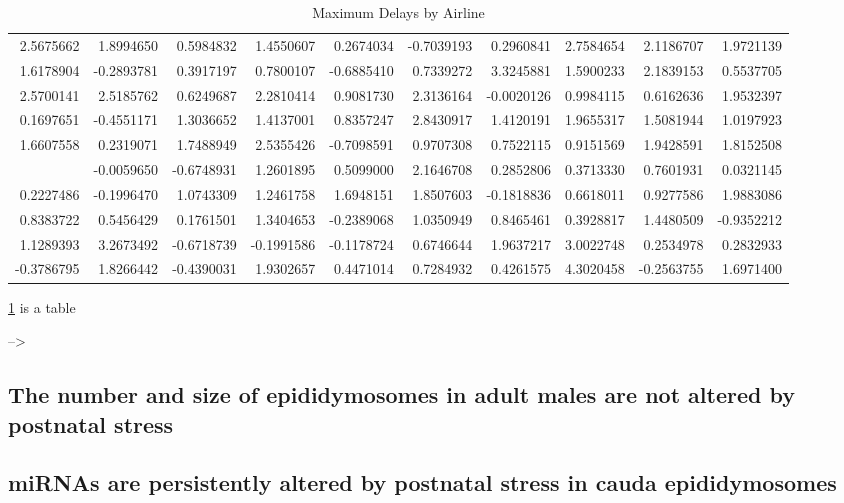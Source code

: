 \documentclass[12pt,twoside]{reedthesis}
\begin{document}
\begin{longtable}[t]{rrrrrrrrrr}
\caption[Max Delays by Airline]{\label{tab:tab1}Maximum Delays by Airline}\\
\toprule
2.5675662 & 1.8994650 & 0.5984832 & 1.4550607 & 0.2674034 & -0.7039193 & 0.2960841 & 2.7584654 & 2.1186707 & 1.9721139\\
1.6178904 & -0.2893781 & 0.3917197 & 0.7800107 & -0.6885410 & 0.7339272 & 3.3245881 & 1.5900233 & 2.1839153 & 0.5537705\\
2.5700141 & 2.5185762 & 0.6249687 & 2.2810414 & 0.9081730 & 2.3136164 & -0.0020126 & 0.9984115 & 0.6162636 & 1.9532397\\
0.1697651 & -0.4551171 & 1.3036652 & 1.4137001 & 0.8357247 & 2.8430917 & 1.4120191 & 1.9655317 & 1.5081944 & 1.0197923\\
1.6607558 & 0.2319071 & 1.7488949 & 2.5355426 & -0.7098591 & 0.9707308 & 0.7522115 & 0.9151569 & 1.9428591 & 1.8152508\\
\addlinespace
1.0153006 & -0.0059650 & -0.6748931 & 1.2601895 & 0.5099000 & 2.1646708 & 0.2852806 & 0.3713330 & 0.7601931 & 0.0321145\\
0.2227486 & -0.1996470 & 1.0743309 & 1.2461758 & 1.6948151 & 1.8507603 & -0.1818836 & 0.6618011 & 0.9277586 & 1.9883086\\
0.8383722 & 0.5456429 & 0.1761501 & 1.3404653 & -0.2389068 & 1.0350949 & 0.8465461 & 0.3928817 & 1.4480509 & -0.9352212\\
1.1289393 & 3.2673492 & -0.6718739 & -0.1991586 & -0.1178724 & 0.6746644 & 1.9637217 & 3.0022748 & 0.2534978 & 0.2832933\\
-0.3786795 & 1.8266442 & -0.4390031 & 1.9302657 & 0.4471014 & 0.7284932 & 0.4261575 & 4.3020458 & -0.2563755 & 1.6971400\\
\bottomrule
\end{longtable}
\ref{tab:tab1} is a table

--\textgreater{}

\hypertarget{the-number-and-size-of-epididymosomes-in-adult-males-are-not-altered-by-postnatal-stress}{%
\subsection{The number and size of epididymosomes in adult males are not altered by postnatal stress}\label{the-number-and-size-of-epididymosomes-in-adult-males-are-not-altered-by-postnatal-stress}}

\hypertarget{mirnas-are-persistently-altered-by-postnatal-stress-in-cauda-epididymosomes}{%
\subsection{miRNAs are persistently altered by postnatal stress in cauda epididymosomes}\label{mirnas-are-persistently-altered-by-postnatal-stress-in-cauda-epididymosomes}}
\end{document}
